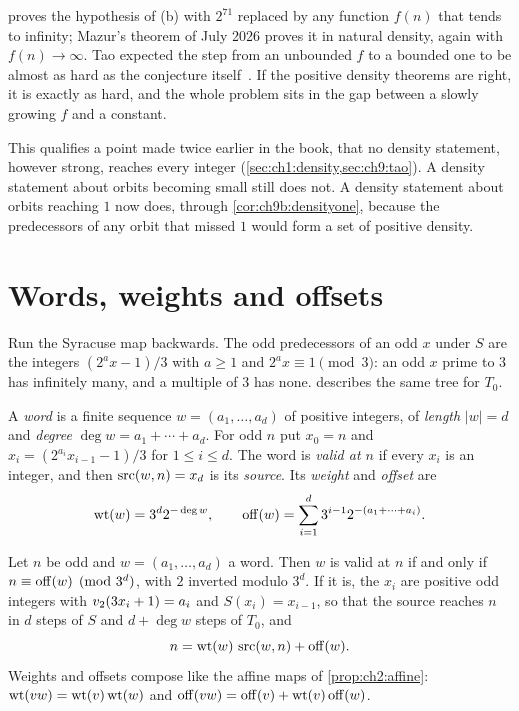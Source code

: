  proves the hypothesis of (b) with $2^{71}$ replaced by any function $f(n)$ that tends to infinity; Mazur's theorem of July 2026 proves it in natural density, again with $f(n)\to\infty$. Tao expected the step from an unbounded $f$ to a bounded one to be almost as hard as the conjecture itself~\cite[Remark~1.4]{tao2022}. If the positive density theorems are right, it is exactly as hard, and the whole problem sits in the gap between a slowly growing $f$ and a constant.

This qualifies a point made twice earlier in the book, that no density statement, however strong, reaches every integer (\cref{sec:ch1:density,sec:ch9:tao}). A density statement about orbits becoming small still does not. A density statement about orbits reaching $1$ now does, through \cref{cor:ch9b:densityone}, because the predecessors of any orbit that missed $1$ would form a set of positive density.

\section{Words, weights and offsets}\label{sec:ch9b:words}

Run the Syracuse map backwards. The odd predecessors of an odd $x$ under $S$ are the integers $(2^ax-1)/3$ with $a\ge1$ and $2^ax\equiv1\pmod3$: an odd $x$ prime to $3$ has infinitely many, and a multiple of $3$ has none.  describes the same tree for $T_0$.

\begin{definition}\label{def:ch9b:words}
A \emph{word} is a finite sequence $w=(a_1,\ldots,a_d)$ of positive integers, of \emph{length} $|w|=d$ and \emph{degree} $\deg w=a_1+\cdots+a_d$. For odd $n$ put $x_0=n$ and $x_i=(2^{a_i}x_{i-1}-1)/3$ for $1\le i\le d$. The word is \emph{valid at $n$} if every $x_i$ is an integer, and then $\operatorname{src}(w,n)=x_d$ is its \emph{source}. Its \emph{weight} and \emph{offset} are
\[
  \operatorname{wt}(w)=3^d2^{-\deg w},\qquad \operatorname{off}(w)=\sum_{i=1}^{d}3^{i-1}2^{-(a_1+\cdots+a_i)} .
\]
\end{definition}

\begin{proposition}\label{prop:ch9b:offset}
Let $n$ be odd and $w=(a_1,\ldots,a_d)$ a word. Then $w$ is valid at $n$ if and only if $n\equiv\operatorname{off}(w)\pmod{3^d}$, with $2$ inverted modulo $3^d$. If it is, the $x_i$ are positive odd integers with $v_2(3x_i+1)=a_i$ and $S(x_i)=x_{i-1}$, so that the source reaches $n$ in $d$ steps of $S$ and $d+\deg w$ steps of $T_0$, and
\begin{equation}\label{eq:ch9b:offset}
  n=\operatorname{wt}(w)\,\operatorname{src}(w,n)+\operatorname{off}(w) .
\end{equation}
Weights and offsets compose like the affine maps of \cref{prop:ch2:affine}: $\operatorname{wt}(vw)=\operatorname{wt}(v)\operatorname{wt}(w)$ and $\operatorname{off}(vw)=\operatorname{off}(v)+\operatorname{wt}(v)\operatorname{off}(w)$.
\end{proposition}


